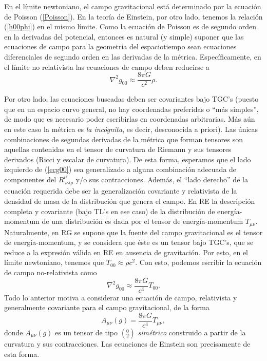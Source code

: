 En el límite newtoniano, el campo gravitacional está determinado por la
ecuación de Poisson (\ref{Poisson}). En la teoría de Einstein, por otro lado,
tenemos la relación (\ref{h00phi}) en el mismo límite. Como la ecuación de
Poisson es de segundo orden en la derivadas del potencial, entonces es natural
(y simple) suponer que las ecuaciones de campo para la geometría del
espaciotiempo sean ecuaciones diferenciales de segundo orden en las derivadas de
la métrica. Específicamente, en el límite no relativista las ecuaciones de campo deben reducirse a
\begin{equation}
 \nabla^2g_{00}\approx\frac{8\pi G}{c^2}\rho . \label{ecg00}
\end{equation}

Por otro lado, las ecuaciones buscadas deben ser covariantes bajo TGC's (puesto
que en un espacio curvo general, no hay coordenadas preferidas o ``más
simples'', de modo que es necesario poder escribirlas en coordenadas
arbitrarias. Más aún en este caso la métrica es \textit{la incógnita}, es decir, desconocida a priori). Las únicas combinaciones de segundas derivadas de la métrica
que forman tensores son aquellas contenidas en el tensor de curvatura de
Riemann y sus tensores derivados (Ricci y escalar de curvatura). De esta forma,
esperamos que el lado izquierdo de (\ref{ecg00}) sea generalizado a alguna
combinación adecuada de componentes del $R^\mu_{\ \nu\lambda\rho}$ y/o sus contracciones.
Además, el ``lado derecho'' de la ecuación requerida debe ser la
generalización covariante y relativista de la densidad de masa de la
distribución que genera el campo. En RE la descripción completa y covariante (bajo TL's en ese caso) de la distribución de energía-momentum de una distribución es dada por el tensor de
energía-momentum $T_{\mu\nu}$. Naturalmente, en RG se supone que la fuente del campo gravitacional es el tensor de energía-momentum, y se considera que éste es un tensor bajo TGC's, que se reduce a la expresión válida en RE en ausencia de gravitación. Por esto, en el límite newtoniano, tenemos que $T_{00}\approx \rho c^2$. Con esto, podemos escribir la ecuación de campo no-relativista como
\begin{equation}
 \nabla^2g_{00}\approx\frac{8\pi G}{c^4}T_{00} . \label{ecg00T}
\end{equation}
Todo lo anterior motiva a considerar una ecuación de campo, relativista y
generalmente covariante para el campo gravitacional, de la forma
\begin{equation}
A_{\mu\nu}(g)=\frac{8\pi G}{c^4}T_{\mu\nu} , \label{ecgmnT}
\end{equation}
donde $A_{\mu\nu}(g)$ es un tensor de tipo $(^0_2)$ \textit{simétrico} construido a partir de la curvatura y sus contracciones. Las ecuaciones de Einstein son precisamente de esta forma.

